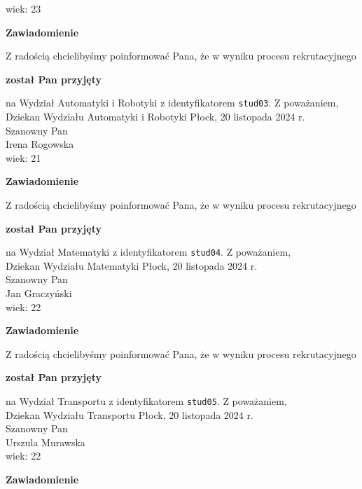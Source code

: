 \documentclass[12pt,a4paper]{article}
\begin{document}
wiek: 23
\bigskip
\begin{center}
 	{\Large\textbf{Zawiadomienie}}
\end{center}
\bigskip
Z radością chcielibyśmy poinformować Pana, że w wyniku procesu rekrutacyjnego 
\begin{center}
\textsf{\textbf{został Pan przyjęty}} 
\end{center}
na Wydział Automatyki i Robotyki z identyfikatorem \verb|stud03|. 
\vspace{2cm}
\noindent
Z poważaniem,\\
Dziekan
Wydziału Automatyki i Robotyki
\newpage
\hfill Płock, 20 listopada 2024 r.\\
\noindent 
Szanowny Pan \\
Irena Rogowska \\
wiek: 21
\bigskip
\begin{center}
 	{\Large\textbf{Zawiadomienie}}
\end{center}
\bigskip
Z radością chcielibyśmy poinformować Pana, że w wyniku procesu rekrutacyjnego 
\begin{center}
\textsf{\textbf{został Pan przyjęty}} 
\end{center}
na Wydział Matematyki z identyfikatorem \verb|stud04|. 
\vspace{2cm}
\noindent
Z poważaniem,\\
Dziekan
Wydziału Matematyki
\newpage
\hfill Płock, 20 listopada 2024 r.\\
\noindent 
Szanowny Pan \\
Jan Graczyński  \\
wiek: 22
\bigskip
\begin{center}
 	{\Large\textbf{Zawiadomienie}}
\end{center}
\bigskip
Z radością chcielibyśmy poinformować Pana, że w wyniku procesu rekrutacyjnego 
\begin{center}
\textsf{\textbf{został Pan przyjęty}} 
\end{center}
na Wydział Transportu z identyfikatorem \verb|stud05|. 
\vspace{2cm}
\noindent
Z poważaniem,\\
Dziekan
Wydziału Transportu
\newpage
\hfill Płock, 20 listopada 2024 r.\\
\noindent 
Szanowny Pan \\
Urszula Murawska  \\
wiek: 22
\bigskip
\begin{center}
 	{\Large\textbf{Zawiadomienie}}
\end{center}
\end{document}
